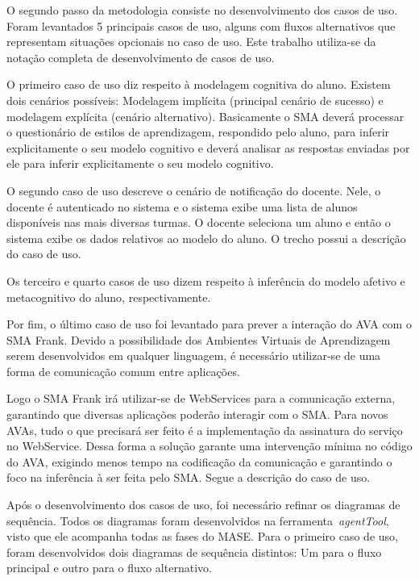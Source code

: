 O segundo passo da metodologia consiste no desenvolvimento dos casos de uso. Foram levantados 5 principais casos de uso, alguns com fluxos alternativos que representam situações opcionais no caso de uso. Este trabalho utiliza-se da notação completa de desenvolvimento de casos de uso.

O primeiro caso de uso diz respeito à modelagem cognitiva do aluno. Existem dois cenários possíveis: Modelagem implícita (principal cenário de sucesso) e modelagem explícita (cenário alternativo). Basicamente o SMA deverá processar o questionário de estilos de aprendizagem, respondido pelo aluno, para inferir explicitamente o seu modelo cognitivo e deverá analisar as respostas enviadas por ele para inferir explicitamente o seu modelo cognitivo.



O segundo caso de uso descreve o cenário de notificação do docente. Nele, o docente é autenticado no sistema e o sistema exibe uma lista de alunos disponíveis nas mais diversas turmas. O docente seleciona um aluno e então o sistema exibe os dados relativos ao modelo do aluno. O trecho possui a descrição do caso de uso.



Os terceiro e quarto casos de uso dizem respeito à inferência do modelo afetivo e metacognitivo do aluno, respectivamente.





Por fim, o último caso de uso foi levantado para prever a interação do AVA com o SMA Frank. Devido a possibilidade dos Ambientes Virtuais de Aprendizagem serem desenvolvidos em qualquer linguagem, é necessário utilizar-se de uma forma de comunicação comum entre aplicações.

Logo o SMA Frank irá utilizar-se de WebServices para a comunicação externa, garantindo que diversas aplicações poderão interagir com o SMA. Para novos AVAs, tudo o que precisará ser feito é a implementação da assinatura do serviço no WebService. Dessa forma a solução garante uma intervenção mínima no código do AVA, exigindo menos tempo na codificação da comunicação e garantindo o foco na inferência à ser feita pelo SMA. Segue a descrição do caso de uso.



Após o desenvolvimento dos casos de uso, foi necessário refinar os diagramas de sequência. Todos os diagramas foram desenvolvidos na ferramenta~\emph{agentTool}, visto que ele acompanha todas as fases do MASE. Para o primeiro caso de uso, foram desenvolvidos dois diagramas de sequência distintos: Um para o fluxo principal e outro para o fluxo alternativo.

